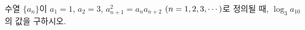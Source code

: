 수열 $\{a_n\}$이 $a_1=1$, $a_2=3$, $a_{n+1}^2=a_na_{n+2}$ $(n=1{,}\mkern3mu\mathopen{}2{,}\mkern3mu\mathopen{}3{,}\mkern3mu\mathopen{}\cdots)$로 정의될 때, $\log_3 a_{10}$의 값을 구하시오.
